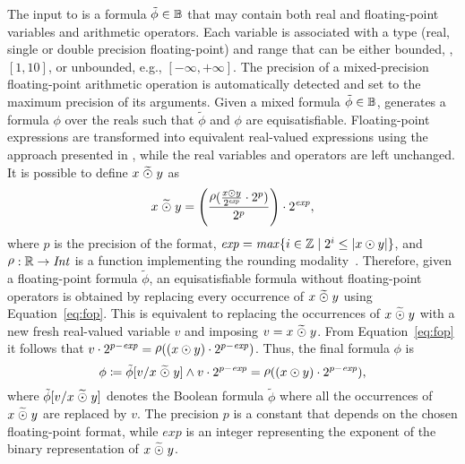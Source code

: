 \documentclass[runningheads,american,orivec,fleqn]{llncs}
\begin{document}
The input to \smttool{} is a formula $\tilde{\phi} \in \mathbb{B}$ that may contain both real and floating-point variables and arithmetic operators.
%
Each variable is associated with a type (real, single or
double precision floating-point) and range that can be
either bounded, \eg{}, $[1,10]$, or unbounded, e.g., $[-\infty, +\infty]$.
%
The precision of a mixed-precision floating-point arithmetic operation is automatically detected and set to the maximum precision of its arguments.
%
Given a mixed formula $\tilde{\phi} \in \mathbb{B}$, \smttool{} generates a formula $\phi$ over the reals such that $\tilde{\phi}$ and $\phi$ are equisatisfiable.
%
Floating-point expressions are transformed into equivalent real-valued expressions using the approach presented in \cite{LeeserMRW14}, while the real variables and operators are left unchanged.
%
It is possible to define $x \mathrel{\widetilde{\odot}} y$ as
% 
\begin{equation}
    \label{eq:fop}
    x \fop y = \left(\frac{\round{\frac{x \rop y}{2^\mathit{exp}}\cdot 2^p}}{2^p}\right) \cdot 2^\mathit{exp},
\end{equation}
% 
where $p$ is the precision of the format, $\mathit{exp} = \mathit{max}\{i\in\mathbb{Z} \mid 2^i \leq |x \odot y|\}$, and
$\round{}: \R \rightarrow \mathit{Int}$ is a function implementing the rounding modality~\cite{LeeserMRW14}.
% 
Therefore, given a floating-point formula $\tilde{\phi}$, an equisatisfiable formula without floating-point operators is obtained by replacing every occurrence of $x \mathrel{\widetilde{\odot}} y$ using Equation~\eqref{eq:fop}.
% 
This is equivalent to replacing the occurrences of $x \mathrel{\widetilde{\odot}} y$ with a new fresh real-valued variable $v$ and imposing $v = x \mathrel{\widetilde{\odot}} y$.
% 
From Equation~\eqref{eq:fop} it follows that $v \cdot 2^{p-\mathit{exp}} = \round{(x \rop y) \cdot 2^{p-\mathit{exp}}}$.
% 
Thus, the final formula $\phi$ is
% 
\begin{equation}
    \phi \dfn \tilde{\phi}[v/x \fop y] \wedge v \cdot 2^{p-\mathit{exp}} = \round{(x \rop y) \cdot 2^{p-\mathit{exp}}},
\end{equation}
% 
where $\tilde{\phi}[v/x \mathrel{\widetilde{\odot}} y]$ denotes the Boolean formula $\tilde{\phi}$ where all the occurrences of $x \mathrel{\widetilde{\odot}} y$ are replaced by $v$.
%
The precision $p$ is a constant that depends on the chosen floating-point format, while $\mathit{exp}$ is an integer representing the exponent of the binary representation of $x \mathrel{\widetilde{\odot}} y$.
\end{document}
